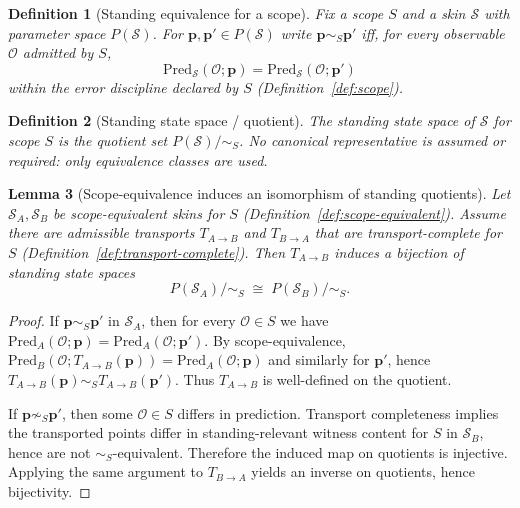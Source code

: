\documentclass[11pt]{article}
\newtheorem{definition}{Definition}[section]
\newtheorem{lemma}[definition]{Lemma}
\theoremstyle{remark}
\newcommand{\Skin}{\mathcal{S}}
\begin{document}
\begin{definition}[Standing equivalence for a scope]\label{def:standing-equiv}
Fix a scope $S$ and a skin $\Skin$ with parameter space $P(\Skin)$.
For $\mathbf{p},\mathbf{p}'\in P(\Skin)$ write $\mathbf{p}\sim_S \mathbf{p}'$ iff, for every observable
$\mathcal{O}$ admitted by $S$,
\[
\mathrm{Pred}_{\Skin}(\mathcal{O};\mathbf{p})=\mathrm{Pred}_{\Skin}(\mathcal{O};\mathbf{p}')
\]
within the error discipline declared by $S$ (Definition~\ref{def:scope}).
\end{definition}

\begin{definition}[Standing state space / quotient]\label{def:standing-quotient}
The \emph{standing state space} of $\Skin$ for scope $S$ is the quotient set $P(\Skin)/\!\sim_S$.
No canonical representative is assumed or required: only equivalence classes are used.
\end{definition}

\begin{lemma}[Scope-equivalence induces an isomorphism of standing quotients]\label{lem:quotient-iso}
Let $\Skin_A,\Skin_B$ be scope-equivalent skins for $S$ (Definition~\ref{def:scope-equivalent}).
Assume there are admissible transports $T_{A\to B}$ and $T_{B\to A}$ that are transport-complete for $S$
(Definition~\ref{def:transport-complete}).
Then $T_{A\to B}$ induces a bijection of standing state spaces
\[
P(\Skin_A)/\!\sim_S\;\cong\; P(\Skin_B)/\!\sim_S.
\]
\end{lemma}

\begin{proof}
If $\mathbf{p}\sim_S \mathbf{p}'$ in $\Skin_A$, then for every $\mathcal{O}\in S$ we have
$\mathrm{Pred}_A(\mathcal{O};\mathbf{p})=\mathrm{Pred}_A(\mathcal{O};\mathbf{p}')$.
By scope-equivalence, $\mathrm{Pred}_B(\mathcal{O};T_{A\to B}(\mathbf{p}))=
\mathrm{Pred}_A(\mathcal{O};\mathbf{p})$ and similarly for $\mathbf{p}'$, hence
$T_{A\to B}(\mathbf{p})\sim_S T_{A\to B}(\mathbf{p}')$.
Thus $T_{A\to B}$ is well-defined on the quotient.

If $\mathbf{p}\not\sim_S \mathbf{p}'$, then some $\mathcal{O}\in S$ differs in prediction.
Transport completeness implies the transported points differ in standing-relevant witness content for $S$ in
$\Skin_B$, hence are not $\sim_S$-equivalent. Therefore the induced map on quotients is injective.
Applying the same argument to $T_{B\to A}$ yields an inverse on quotients, hence bijectivity.
\end{proof}
\end{document}
